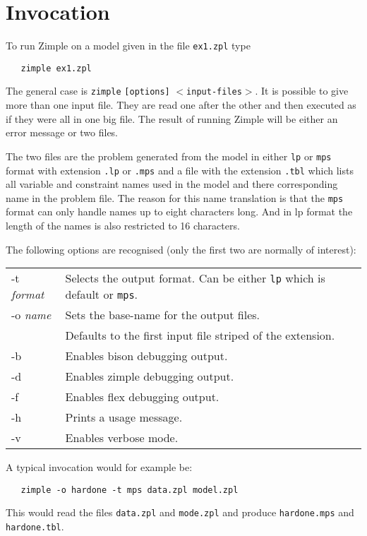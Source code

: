 \documentclass[12pt]{article}
\newcommand{\zimple}{{\sc Zimple}\xspace}
\newcommand{\lp}{{\sc lp}\xspace}
\newcommand{\mps}{{\tt mps}\xspace}
\newcommand{\lpf}{{\tt lp}\xspace}
\newcommand{\code}[1]{{\tt #1}\xspace}
\begin{document}
\section{Invocation}

To run \zimple on a model given in the file \code{ex1.zpl} type
\begin{verbatim}
   zimple ex1.zpl
\end{verbatim}

The general case is \code{zimple} \code{[options]} $<$\code{input-files}$>$.
It is possible to give more than one input file. They are read one
after the other and then executed as if they were all in one big file.
The result of running \zimple will be either an error message or two files.

The two files are the problem generated from the model in either 
\lpf or \mps format with extension \code{.lp} or \code{.mps} and a file
with the extension \code{.tbl} which lists all variable and constraint 
names used in the model and there corresponding name in the problem
file. The reason for this name translation is that the \mps format
can only handle names up to eight characters long. And in \lp format
the length of the names is also restricted to 16 characters.

\medskip
The following options are recognised (only the first two are normally
of interest):

\medskip
\begin{tabular}{ll}
-t {\em format}& Selects the output format. Can be either \code{lp}
which is default or \code{mps}.\\
-o {\em name} & Sets the base-name for the output files.\\ 
& Defaults to the first input file striped of the extension.\\
-b&Enables bison debugging output.\\
-d&Enables zimple debugging output.\\
-f&Enables flex debugging output.\\
-h&Prints a usage message.\\
-v&Enables verbose mode.\\
\end{tabular}

\medskip
A typical invocation would for example be:
\begin{verbatim}
   zimple -o hardone -t mps data.zpl model.zpl
\end{verbatim}
This would read the files \code{data.zpl} and \code{mode.zpl} and
produce \code{hardone.mps} and \code{hardone.tbl}.
\end{document}
